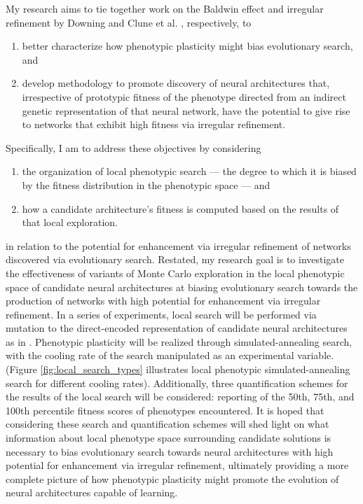 My research aims to tie together work on the Baldwin effect and irregular refinement by Downing \cite{Downing2009ComputationalEffect,Downing2010TheNetworks,DowningHeterochronousBaldwinism} and Clune et al. \cite{Clune2011OnRegularity}, respectively, to
\begin{enumerate}
  \item better characterize how phenotypic plasticity might bias evolutionary search, and
  \item develop methodology to promote discovery of neural architectures that, irrespective of prototypic fitness of the phenotype directed from an indirect genetic representation of that neural network, have the potential to give rise to networks that exhibit high fitness via irregular refinement.
\end{enumerate}
Specifically, I am to address these objectives by considering
\begin{enumerate}
  \item the organization of local phenotypic search --- the degree to which it is biased by the fitness distribution in the phenotypic space --- and
  \item how a candidate architecture's fitness is computed based on the results of that local exploration.
\end{enumerate}
in relation to the potential for enhancement via irregular refinement of networks discovered via evolutionary search. Restated, my research goal is to investigate the effectiveness of variants of Monte Carlo exploration in the local phenotypic space of candidate neural architectures at biasing evolutionary search towards the production of networks with high potential for enhancement via irregular refinement. In a series of experiments, local search will be performed via mutation to the direct-encoded representation of candidate neural architectures as in \cite{Clune2011OnRegularity}. Phenotypic plasticity will be realized through simulated-annealing search, with the cooling rate of the search manipulated as an experimental variable. (Figure \ref{fig:local_search_types} illustrates local phenotypic simulated-annealing search for different cooling rates). Additionally, three quantification schemes for the results of the local search will be considered: reporting of the 50th, 75th, and 100th percentile fitness scores of phenotypes encountered. It is hoped that considering these search and quantification schemes will shed light on what information about local phenotype space surrounding candidate solutions is necessary to bias evolutionary search towards neural architectures with high potential for enhancement via irregular refinement, ultimately providing a more complete picture of how phenotypic plasticity might promote the evolution of neural architectures capable of learning.

